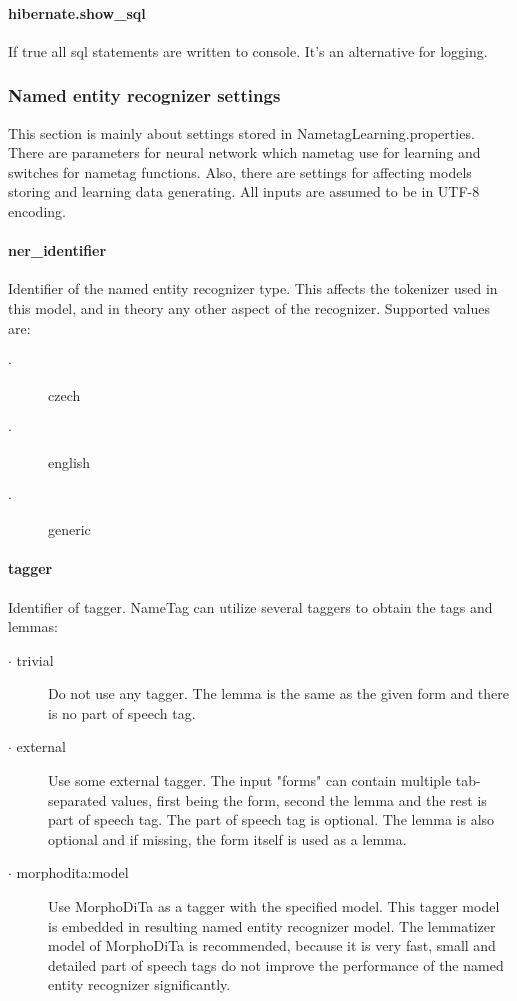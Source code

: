 \documentclass[12pt,a4paper]{report}
\begin{document}
\paragraph{hibernate.show\_sql}
If true all sql statements are written to console. It's an alternative for logging.

\subsubsection{Named entity recognizer settings}
This section is mainly about settings stored in NametagLearning.properties.
There are parameters for neural network which nametag use for learning and switches for nametag functions.
Also, there are settings for affecting models storing and learning data generating.
All inputs are assumed to be in UTF-8 encoding.


\paragraph{ner\_identifier}
Identifier of the named entity recognizer type. This affects the tokenizer used in this model, and in theory any other aspect of the recognizer. Supported values are:
\begin{description}
\item[$\cdot$] czech
\item[$\cdot$] english
\item[$\cdot$] generic
\end{description}

\paragraph{tagger}
Identifier of tagger. NameTag can utilize several taggers to obtain the tags and lemmas:

\begin{description}
\item[$\cdot$ trivial] Do not use any tagger. The lemma is the same as the given form and there is no part of speech tag.
\item[$\cdot$ external] Use some external tagger. The input "forms" can contain multiple tab-separated values, first being the form, second the lemma and the rest is part of speech tag. The part of speech tag is optional. The lemma is also optional and if missing, the form itself is used as a lemma.
\item[$\cdot$ morphodita:model] Use MorphoDiTa as a tagger with the specified model. This tagger model is embedded in resulting named entity recognizer model. The lemmatizer model of MorphoDiTa is recommended, because it is very fast, small and detailed part of speech tags do not improve the performance of the named entity recognizer significantly.
\end{description}
\end{document}
